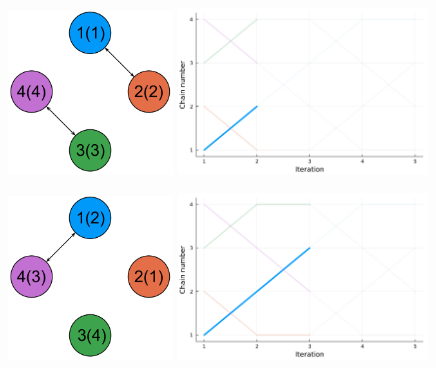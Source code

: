 \begin{figure}[t] 
  \centering 
  \begin{minipage}{0.48\textwidth}
    \centering
    \includegraphics[width=0.39\textwidth]{../img/Communication_1_v3.pdf}
    \includegraphics[width=0.59\textwidth]{../img/index_process_1.pdf}
  \end{minipage}
  \begin{minipage}{0.48\textwidth}
    \centering
    \includegraphics[width=0.39\textwidth]{../img/Communication_2_v3.pdf}
    \includegraphics[width=0.59\textwidth]{../img/index_process_2.pdf}

\end{minipage}
\end{figure}
